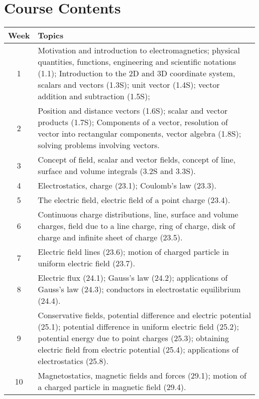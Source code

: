 \documentclass[12pt,a4paper]{article}
\begin{document}
\section{Course Contents}
\begin{center}
\vspace{-0.5cm}
	\begin{longtable}{|c|p{13cm}|}
	\hline \hline
		\rule{0pt}{2.6ex} \textbf{Week} & \textbf{Topics}\\
		\hline
		1 \rule{0pt}{2.6ex} & Motivation and introduction to electromagnetics; physical quantities, functions, engineering and scientific notations (1.1); Introduction to the 2D and 3D coordinate system, scalars and vectors (1.3S); unit vector (1.4S); vector addition and subtraction (1.5S);\\
		\hline
		2 \rule{0pt}{2.6ex} & Position and distance vectors (1.6S); scalar and vector products (1.7S); Components of a vector, resolution of vector into rectangular components, vector algebra (1.8S); solving problems involving vectors.\\
		\hline
		3 \rule{0pt}{2.6ex} & Concept of field, scalar and vector fields, concept of line, surface and volume integrals (3.2S and 3.3S).\\
		\hline
		4 \rule{0pt}{2.6ex} & Electrostatics, charge (23.1); Coulomb's law (23.3).\\
		\hline
		5 \rule{0pt}{2.6ex} &  The electric field, electric field of a point charge (23.4).\\
		\hline
		\hline
		6 \rule{0pt}{2.6ex} & Continuous charge distributions, line, surface and volume charges,  field due to a line charge, ring of charge, disk of charge and infinite sheet of charge (23.5).\\
		\hline
		7 \rule{0pt}{2.6ex} & Electric field lines (23.6); motion of charged particle in uniform electric field (23.7).\\
		\hline
		8 \rule{0pt}{2.6ex} & Electric flux (24.1); Gauss's law (24.2); applications of Gauss's law (24.3); conductors in electrostatic equilibrium (24.4).\\
		\hline
		9 \rule{0pt}{2.6ex} & Conservative fields, potential difference and electric potential (25.1); potential difference in uniform electric field (25.2); potential energy due to point charges (25.3); obtaining electric field from electric potential (25.4); applications of electrostatics (25.8).\\
		\hline
		10 \rule{0pt}{2.6ex} & Magnetostatics, magnetic fields and forces (29.1); motion of a charged particle in magnetic field (29.4).\\

\end{longtable}
\end{center}
\end{document}

